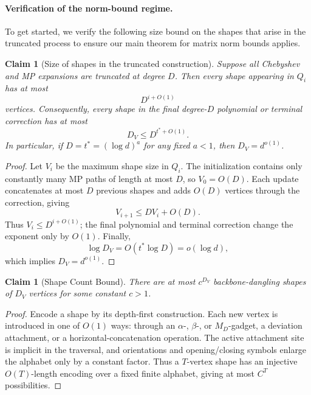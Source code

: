 \documentclass[12pt]{article}
\newtheorem{claim}[theorem]{Claim}
\begin{document}
\paragraph{Verification of the norm-bound regime.}
To get started, we verify the following size bound on the shapes that arise in the truncated process to ensure our main theorem for matrix norm bounds applies.
\begin{claim}[Size of shapes in the truncated construction]
\label{claim:shape-size-truncated-construction}
Suppose all Chebyshev and MP expansions are truncated at degree \(D\).
Then every shape appearing in \(Q_i\) has at most
\[
    D^{i+O(1)}
\]
vertices. Consequently, every shape in the final degree-\(D\) polynomial
or terminal correction has at most
\[
    D_V\leq D^{t^\ast+O(1)}.
\]
In particular, if \(D=t^\ast=(\log d)^a\) for any fixed \(a<1\), then
\(D_V=d^{o(1)}\).
\end{claim}

\begin{proof}
Let \(V_i\) be the maximum shape size in \(Q_i\). The initialization
contains only constantly many MP paths of length at most \(D\), so
\(V_0=O(D)\). Each update concatenates at most \(D\) previous shapes and
adds \(O(D)\) vertices through the correction, giving
\[
    V_{i+1}\leq DV_i+O(D).
\]
Thus \(V_i\leq D^{i+O(1)}\); the final polynomial and terminal correction
change the exponent only by \(O(1)\). Finally,
\[
    \log D_V=O(t^\ast\log D)=o(\log d),
\]
which implies \(D_V=d^{o(1)}\).
\end{proof}

\begin{claim}[Shape Count Bound] \label{clm:shape-count}
	There are at most $c^{D_V}$ backbone-dangling shapes of $D_V$ vertices for some constant $c>1$.
\end{claim}

\begin{proof}
Encode a shape by its depth-first construction. Each new vertex is
introduced in one of \(O(1)\) ways: through an
\(\alpha\)-, \(\beta\)-, or \(M_D\)-gadget, a deviation attachment,
or a horizontal-concatenation operation. The active attachment site
is implicit in the traversal, and orientations and opening/closing
symbols enlarge the alphabet only by a constant factor. Thus a
\(T\)-vertex shape has an injective \(O(T)\)-length encoding over a
fixed finite alphabet, giving at most \(C^T\) possibilities.
\end{proof}
\end{document}
